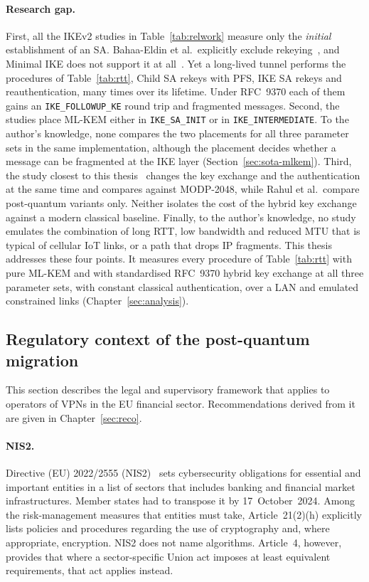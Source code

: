 \paragraph{Research gap.}
First, all the IKEv2 studies in Table~\ref{tab:relwork} measure only the
\emph{initial} establishment of an SA. Bahaa-Eldin et al.\ explicitly exclude
rekeying~\cite{bahaaeldin2026}, and Minimal IKE does not support it at
all~\cite{dezuane2026}. Yet a long-lived tunnel performs the procedures of
Table~\ref{tab:rtt}, Child SA rekeys with PFS, IKE SA rekeys and
reauthentication, many times over its lifetime. Under RFC~9370 each of them
gains an \texttt{IKE\_FOLLOWUP\_KE} round trip and fragmented messages. Second,
the studies place ML-KEM either in \texttt{IKE\_SA\_INIT} or in
\texttt{IKE\_INTERMEDIATE}. To the author's knowledge, none compares the two
placements for all three parameter sets in the same implementation, although
the placement decides whether a message can be fragmented at the IKE layer
(Section~\ref{sec:sota-mlkem}). Third, the study closest
to this thesis~\cite{twardokus2025} changes the key exchange and the
authentication at the same time and compares against MODP-2048, while Rahul
et al.\ compare post-quantum variants only. Neither isolates the cost of the
hybrid key exchange against a modern classical baseline. Finally, to the
author's knowledge, no study emulates the combination of long RTT, low
bandwidth and reduced MTU that is typical of cellular IoT links, or a path
that drops IP fragments. This thesis addresses these four points. It measures
every procedure of Table~\ref{tab:rtt} with pure ML-KEM and with standardised
RFC~9370 hybrid key exchange at all three parameter sets, with constant
classical authentication, over a LAN and emulated constrained links
(Chapter~\ref{sec:analysis}).

\subsection{Regulatory context of the post-quantum migration}
\label{sec:sota-regulatory}

This section describes the legal and supervisory framework that applies to
operators of VPNs in the EU financial sector. Recommendations derived from it
are given in Chapter~\ref{sec:reco}.

\paragraph{NIS2.}
Directive (EU) 2022/2555 (NIS2)~\cite{nis2} sets cybersecurity obligations
for essential and important entities in a list of sectors that includes
banking and financial market infrastructures. Member states had to transpose it
by 17~October~2024. Among the risk-management measures that entities must take,
Article~21(2)(h) explicitly lists policies and procedures regarding the use of
cryptography and, where appropriate, encryption. NIS2 does not name
algorithms. Article~4, however, provides that where a sector-specific Union act
imposes at least equivalent requirements, that act applies instead.

